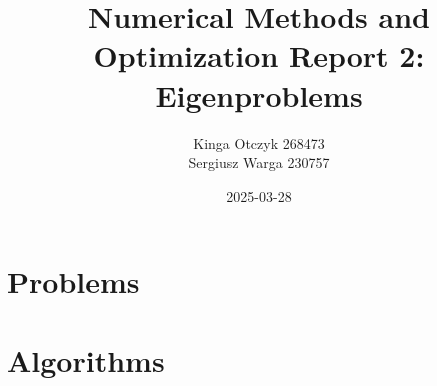 \documentclass[a4paper]{article}
\title{Numerical Methods and Optimization Report 2:
  Eigenproblems}
\author{Kinga Otczyk 268473\\Sergiusz Warga 230757}
\date{2025-03-28}
\begin{document}
\maketitle
\tableofcontents
\pagebreak

\section{Problems}





\clearpage

\section{Algorithms}


\clearpage

\nocite{Meyer, GoluVanl96, Zdunek}


\end{document}
